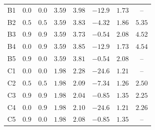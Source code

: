 \documentclass[referee]{aa}
\begin{document}
\begin{table}
\begin{tabular}{c c c c  c c c c}
 \hline 
B1 & $0.0$ & $0.0$ & $3.59$ &  $3.98$  & $-12.9$ & $1.73$ & -- \\ 
B2 & $0.5$ & $0.5$ & $3.59$ &  $3.83$  & $-4.32$ & $1.86$ & $5.35$\\ 
B3 & $0.9$ & $0.9$ & $3.59$ &  $3.73$  & $-0.54$ & $2.08$ & $4.52$\\ 
B4 & $0.0$ & $0.9$ & $3.59$ &  $3.85$  & $-12.9$ & $1.73$ & $4.54$\\ 
B5 & $0.9$ & $0.0$ & $3.59$ &  $3.81$  & $-0.54$ & $2.08$ & -- \\  
 \hline 
C1 & $0.0$ & $0.0$ & $1.98$ &  $2.28$  & $-24.6$ & $1.21$ & -- \\ 
C2 & $0.5$ & $0.5$ & $1.98$ &  $2.09$  & $-7.34$ & $1.26$ & $2.50$\\ 
C3 & $0.9$ & $0.9$ & $1.98$ &  $2.04$  & $-0.85$ & $1.35$ & $2.25$\\ 
C4 & $0.0$ & $0.9$ & $1.98$ &  $2.10$  & $-24.6$ & $1.21$ & $2.26$\\ 
C5 & $0.9$ & $0.0$ & $1.98$ &  $2.08$  & $-0.85$ & $1.35$ & --\\ 
\hline      
\end{tabular}
\end{table}
\end{document}
